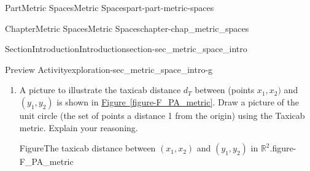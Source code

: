 \documentclass[oneside,10pt,]{book}
\newcommand{\xreffont}{\relax}
\numberwithin{equation}{chapter}
\newcommand{\R}{\mathbb{R}}
\newcommand{\lt}{<}
\newcommand{\gt}{>}
\begin{document}
\begin{partptx}{Part}{Metric Spaces}{}{Metric Spaces}{}{}{part-part-metric-spaces}
\begin{chapterptx}{Chapter}{Metric Spaces}{}{Metric Spaces}{}{}{chapter-chap_metric_spaces}
\begin{sectionptx}{Section}{Introduction}{}{Introduction}{}{}{section-sec_metric_space_intro}
\begin{exploration}{Preview Activity}{}{exploration-sec_metric_space_intro-g}
\begin{enumerate}[font=\bfseries,label=(\alph*),ref=\alph*]
\begin{proof}{Proof}{}{proof-lem_abs_TI-b}
\begin{descriptionlist}
\begin{dlinarrow}{Case 3: One of \(a\) or \(b\) is positive and the other negative}{li-lem_abs_TI-b-a-c-c}
\begin{itemize}[label=\textbullet]
\begin{equation*}
| b | = -b \gt 2a = 2| a | \gt | a |\text{.}
\end{equation*}
Then \(a+b \lt  a = | a | \lt  | b |\). Finally, \(a \gt 0\) implies \(a+b \gt b = -| b |\). So%
\begin{equation*}
- | b | \lt  a+b \lt  | b |
\end{equation*}
and%
\begin{equation*}
| a+b | \leq | b | \lt  | a | + | b |\text{.}
\end{equation*}
%
\end{itemize}
%
\end{dlinarrow}%
\end{descriptionlist}
This proves our lemma for every possible pair \(a\), \(b\).%
\end{proof}
\item{}A picture to illustrate the taxicab distance \(d_T\) between (points \(x_1,x_2)\) and \((y_1,y_2)\) is shown in \hyperref[figure-F_PA_metric]{Figure~{\xreffont\ref{figure-F_PA_metric}}}. Draw a picture of the unit circle (the set of points a distance 1 from the origin) using the Taxicab metric. Explain your reasoning.%
\begin{figureptx}{Figure}{The taxicab distance between \((x_1,x_2)\) and \((y_1,y_2)\) in \(\R^2\).}{figure-F_PA_metric}{}%
\begin{image}{0.25}{0.5}{0.25}{}%

\end{image}
\end{figureptx}
\end{enumerate}
\end{exploration}
\end{sectionptx}
\end{chapterptx}
\end{partptx}
\end{document}
